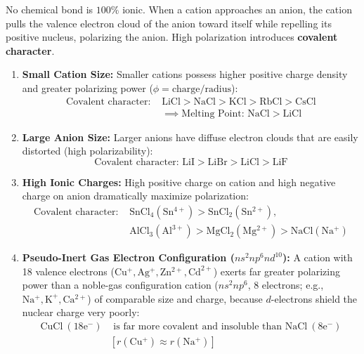 \documentclass[10pt,twoside,openright]{book}
\begin{document}
\begin{conceptbox}
No chemical bond is $100\%$ ionic. When a cation approaches an anion, the cation pulls the valence electron cloud of the anion toward itself while repelling its positive nucleus, polarizing the anion. High polarization introduces \textbf{covalent character}.
\begin{enumerate}
  \item \textbf{Small Cation Size:} Smaller cations possess higher positive charge density and greater polarizing power ($\phi = \text{charge}/\text{radius}$):
  \begin{align}
    \text{Covalent character: } &\mathrm{LiCl > NaCl > KCl > RbCl > CsCl} \\
    &\implies \text{Melting Point: } \mathrm{NaCl > LiCl}
  \end{align}
  \item \textbf{Large Anion Size:} Larger anions have diffuse electron clouds that are easily distorted (high polarizability):
  \begin{equation}
    \text{Covalent character: } \mathrm{LiI > LiBr > LiCl > LiF}
  \end{equation}
  \item \textbf{High Ionic Charges:} High positive charge on cation and high negative charge on anion dramatically maximize polarization:
  \begin{align}
    \text{Covalent character: } &\mathrm{SnCl_4 (Sn^{4+}) > SnCl_2 (Sn^{2+})}, \\
    &\mathrm{AlCl_3 (Al^{3+}) > MgCl_2 (Mg^{2+}) > NaCl (Na^+)}
  \end{align}
  \item \textbf{Pseudo-Inert Gas Electron Configuration ($ns^2 np^6 nd^{10}$):}
  A cation with 18 valence electrons ($\mathrm{Cu^+, Ag^+, Zn^{2+}, Cd^{2+}}$) exerts far greater polarizing power than a noble-gas configuration cation ($ns^2 np^6$, 8 electrons; e.g., $\mathrm{Na^+, K^+, Ca^{2+}}$) of comparable size and charge, because $d$-electrons shield the nuclear charge very poorly:
  \begin{align}
    \mathrm{CuCl\ (18e^-)} &\text{ is far more covalent and insoluble than } \mathrm{NaCl\ (8e^-)} \\
    &[r(\mathrm{Cu^+}) \approx r(\mathrm{Na^+})]
  \end{align}
\end{enumerate}
\end{conceptbox}
\end{document}
